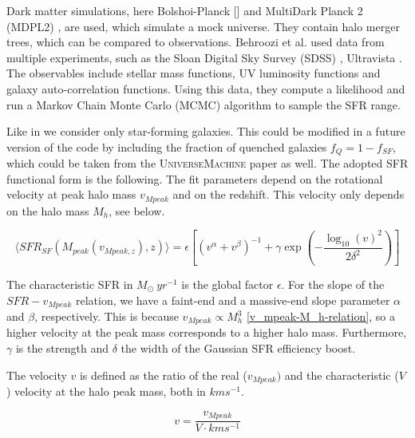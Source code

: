 Dark matter simulations, here Bolshoi-Planck [\cite{klypin_dark_2011}] and MultiDark Planck 2 (MDPL2) \cite{klypin_multidark_2016}, are used, which simulate a mock universe. They contain halo merger trees, which can be compared to observations. Behroozi et al. used data from multiple experiments, such as the Sloan Digital Sky Survey (SDSS) \cite{abazajian_seventh_2009}, Ultravista \cite{mccracken_ultravista_2012}. The observables include stellar mass functions, UV luminosity functions and galaxy auto-correlation functions.
Using this data, they compute a likelihood and run a Markov Chain Monte Carlo (MCMC) algorithm to sample the SFR range.

Like in \cite{dallarmi_dipole_2022} we consider only star-forming galaxies. This could be modified in a future version of the code by including the fraction of quenched galaxies $f_Q = 1 -f_{SF}$, which could be taken from the \textsc{UniverseMachine} paper as well. The adopted SFR functional form is the following. The fit parameters depend on the rotational velocity at peak halo mass $v_{Mpeak}$ and on the redshift. This velocity only depends on the halo mass $M_h$, see below.

\begin{equation}
    \langle SFR_{SF}(M_{peak}(v_{Mpeak, z}), z)\rangle = \epsilon \left[ \left( v^\alpha + v^\beta \right)^{-1} + \gamma \exp \left(-\frac{\log_{10}(v)^2}{2\delta^2}\right) \right]
\end{equation}

The characteristic SFR  in $M_\odot\ yr^{-1}$ is the global factor $\epsilon$. For the slope of the $SFR-v_{Mpeak}$ relation, we have a faint-end and a massive-end slope parameter $\alpha$ and $\beta$, respectively. This is because $v_{Mpeak} \propto M_h^3$ \ref{v_mpeak-M_h-relation}, so a higher velocity at the peak mass corresponds to a higher halo mass.
Furthermore, $\gamma$ is the strength and $\delta$ the width of the Gaussian SFR efficiency boost. 

The velocity $v$ is defined as the ratio of the real ($v_{Mpeak})$ and the characteristic ($V$) velocity at the halo peak mass, both in $km s^{-1}$.

\begin{equation}
    v = \frac{v_{Mpeak}}{V \cdot km s^{-1}}
\end{equation}



